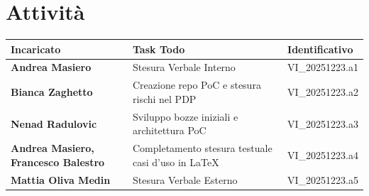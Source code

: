 \documentclass[a4paper,12pt]{article}
\begin{document}
\section{Attività}
\begin{tabularx}{\textwidth}{|l|X|l|}
    \hline
    \textbf{Incaricato} & \textbf{Task Todo} & \textbf{Identificativo} \\
    \hline
    \textbf{Andrea Masiero} & Stesura Verbale Interno & VI\_20251223.a1 \\
    \hline
    \textbf{Bianca Zaghetto} & Creazione repo PoC e stesura rischi nel PDP & VI\_20251223.a2 \\
    \hline
    \textbf{Nenad Radulovic} & Sviluppo bozze iniziali e architettura PoC & VI\_20251223.a3 \\
    \hline
    \textbf{Andrea Masiero, Francesco Balestro} & Completamento stesura testuale casi d'uso in LaTeX & VI\_20251223.a4 \\
    \hline
    \textbf{Mattia Oliva Medin} & Stesura Verbale Esterno & VI\_20251223.a5 \\
    \hline
\end{tabularx}
\end{document}
